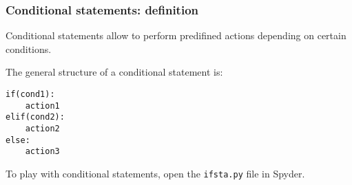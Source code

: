 \begin{frame}[fragile]
    \frametitle{Conditional statements: definition}
    Conditional statements allow to perform predifined actions depending on certain conditions. 
    \vspace{1em}

    The general structure of a conditional statement is:
    \begin{lstlisting}[basicstyle=\ttfamily\scriptsize]
if(cond1):
    action1
elif(cond2):
    action2
else:
    action3
    \end{lstlisting}

    \vspace{1em}
    To play with conditional statements, open the \verb+ifsta.py+ file in Spyder.

\end{frame}
